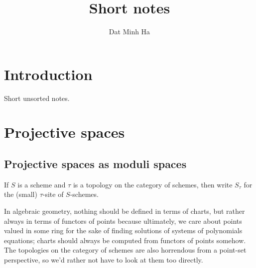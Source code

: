 

\setcounter{section}{-1}





    \title{Short notes}
    
    \author{Dat Minh Ha}
    \maketitle
    
    \begin{abstract}
        
    \end{abstract}
    
    {
      \hypersetup{} 
      \tableofcontents %
    }

    \section{Introduction}
        Short unsorted notes.

    \section{Projective spaces}
        \subsection{Projective spaces as moduli spaces}
            \begin{convention}
                If $S$ is a scheme and $\tau$ is a topology on the category of schemes, then write $S_{\tau}$ for the (small) $\tau$-site of $S$-schemes.
            \end{convention}
        
            In algebraic geometry, nothing should be defined in terms of charts, but rather always in terms of functors of points because ultimately, we care about points valued in some ring for the sake of finding solutions of systems of polynomials equations; charts should always be computed from functors of points somehow. The topologies on the category of schemes are also horrendous from a point-set perspective, so we'd rather not have to look at them too directly.
            
